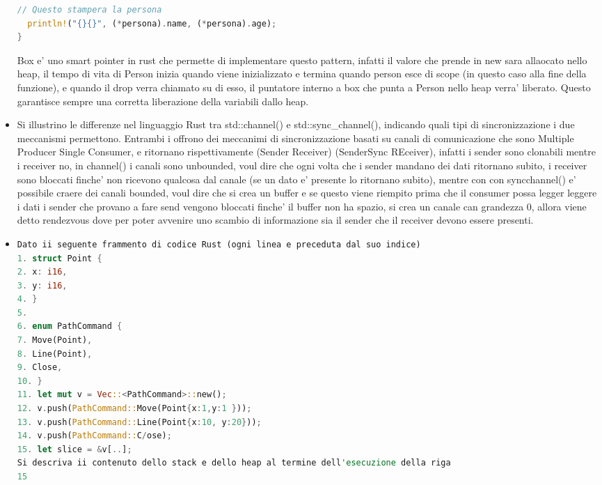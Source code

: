 \documentclass[12pt]{article}
\begin{document}
\begin{itemize}
\begin{lstlisting}[language=rust]
  // Questo stampera la persona
  println!("{}{}", (*persona).name, (*persona).age);
}
  \end{lstlisting}
  Box e' uno smart pointer in rust che permette di implementare questo pattern, infatti il valore che prende in new sara allaocato nello heap, il tempo di vita di Person inizia quando viene inizializzato e termina quando person esce di scope (in questo caso alla fine della funzione), e quando il drop verra chiamato su di esso, il puntatore interno a box che punta a Person nello heap verra' liberato. Questo garantisce sempre una corretta liberazione della variabili dallo heap.
  \item Si illustrino le differenze nel linguaggio Rust tra std::channel() e std::sync\_channel(), indicando quali tipi di sincronizzazione i due meccanismi permettono. Entrambi i offrono dei meccanimi di sincronizzazione basati su canali di comunicazione che sono Multiple Producer Single Consumer, e ritornano rispettivamente (Sender Receiver) (SenderSync REceiver), infatti i sender sono clonabili mentre i receiver no, in channel() i canali sono unbounded, voul dire che ogni volta che i sender mandano dei dati ritornano subito, i receiver sono bloccati finche' non ricevono qualcosa dal canale (se un dato e' presente lo ritornano subito), mentre con con syncchannel() e'  possibile craere dei canali bounded, voul dire che si crea un buffer e se questo viene riempito prima che il consumer possa legger leggere i dati i sender che provano a fare send vengono bloccati finche' il buffer non ha spazio, si crea un canale can grandezza 0, allora viene detto rendezvous dove per poter avvenire uno scambio di informazione sia il sender che il receiver devono essere presenti.
  \item 
  \begin{lstlisting}[language=rust]
Dato ii seguente frammento di codice Rust (ogni linea e preceduta dal suo indice)
1. struct Point {
2. x: i16,
3. y: i16,
4. }
5.
6. enum PathCommand {
7. Move(Point),
8. Line(Point),
9. Close,
10. }
11. let mut v = Vec::<PathCommand>::new();
12. v.push(PathCommand::Move(Point{x:1,y:1 }));
13. v.push(PathCommand::Line(Point{x:10, y:20}));
14. v.push(PathCommand::C/ose);
15. let slice = &v[..];
Si descriva ii contenuto dello stack e dello heap al termine dell'esecuzione della riga
15 
  \end{lstlisting}

\end{itemize}
\end{document}
